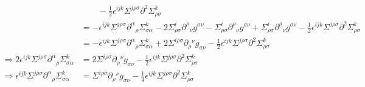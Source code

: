 \documentclass[10pt]{report}
\theoremstyle{definition}
\begin{document}
\begin{align}
&\quad\quad - \frac{1}{2}\epsilon^{ijk} \Sigma^{j\rho\sigma} \partial^2 \Sigma^k_{\rho\sigma} \nonumber\nonumber\\ &= -\epsilon^{ijk} \Sigma^{j\rho\sigma} \partial^\alpha{}_\rho \Sigma^k_{\sigma\alpha} - 2\Sigma^i_{\rho\sigma} \partial^\rho{}_\nu g^{\sigma\nu} - \Sigma^i_{\rho\sigma} \partial^\rho{}_\nu g^{\sigma\nu} + \Sigma^i_{\rho\sigma} \partial^\rho{}_\nu g^{\sigma\nu} - \frac{1}{2}\epsilon^{ijk} \Sigma^{j\rho\sigma} \partial^2 \Sigma^k_{\rho\sigma} \nonumber\nonumber\\ &= -\epsilon^{ijk} \Sigma^{j\rho\sigma} \partial^\alpha{}_\rho \Sigma^k_{\sigma\alpha} + 2\Sigma^{i\rho\sigma} \partial_\rho{}^\nu g_{\sigma\nu} - \frac{1}{2}\epsilon^{ijk} \Sigma^{j\rho\sigma} \partial^2 \Sigma^k_{\rho\sigma} \nonumber\\[10pt]
                \Rightarrow 2\epsilon^{ijk} \Sigma^{j\rho\sigma} \partial^\alpha{}_\rho \Sigma^k_{\sigma\alpha} &= 2\Sigma^{i\rho\sigma} \partial_\rho{}^\nu g_{\sigma\nu} - \frac{1}{2}\epsilon^{ijk} \Sigma^{j\rho\sigma} \partial^2 \Sigma^k_{\rho\sigma} \nonumber\nonumber\\
                \Rightarrow \epsilon^{ijk} \Sigma^{j\rho\sigma} \partial^\alpha{}_\rho \Sigma^k_{\sigma\alpha} &= \Sigma^{i\rho\sigma} \partial_\rho{}^\nu g_{\sigma\nu} - \frac{1}{4}\epsilon^{ijk} \Sigma^{j\rho\sigma} \partial^2 \Sigma^k_{\rho\sigma}
        \end{align}
   
    \newpage
\end{document}
